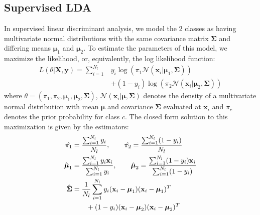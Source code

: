 \documentclass[10pt, a4paper, conference]{IEEEtran}
\begin{document}
\subsection{Supervised LDA}
In supervised linear discriminant analysis, we model the 2 classes as having multivariate normal distributions with the same covariance matrix $\boldsymbol{\Sigma}$ and differing means $\boldsymbol{\mu}_1$ and $\boldsymbol{\mu}_2$. To estimate the parameters of this model, we maximize the likelihood, or, equivalently, the log likelihood function:
\begin{align}
\label{eq:lda}
L(\theta|\mathbf{X},\mathbf{y})= \sum_{i=1}^{N_l} & y_i \log(\pi_1 \mathcal{N}(\mathbf{x}_i|\boldsymbol{\mu}_1,\mathbf{\Sigma})) \nonumber \\
& +(1-y_i) \log(\pi_2 \mathcal{N}(\mathbf{x}_i|\boldsymbol{\mu}_2,\mathbf{\Sigma}))
\end{align}
where $\theta=\left( \pi_1,\pi_2, \boldsymbol{\mu}_1,\boldsymbol{\mu}_2,\mathbf{\Sigma} \right)$, $\mathcal{N}(\mathbf{x}_i|\boldsymbol{\mu},\mathbf{\Sigma})$ denotes the density of a multivariate normal distribution with mean $\boldsymbol{\mu}$ and covariance $\mathbf{\Sigma}$ evaluated at $\mathbf{x}_i$ and $\pi_c$ denotes the prior probability for class $c$. The closed form solution to this maximization is given by the estimators:
\begin{align}
\label{eq:ldasolution}
\hat{\pi_1} &= \frac{\sum_{i=1}^{N_l} y_i}{N_l}, \hspace{20px} \hat{\pi_2} = \frac{\sum_{i=1}^{N_l} (1-y_i)}{N_l}  \nonumber \\
\hat{\boldsymbol{\mu}}_1 &= \frac{\sum_{i=1}^{N_l} y_i \mathbf{x}_i}{\sum_{i=1}^{N_l} y_i}, \hspace{20px} \hat{\boldsymbol{\mu}}_2 = \frac{\sum_{i=1}^{N_l} (1-y_i) \mathbf{x}_i}{\sum_{i=1}^{N_l} (1-y_i)}  \nonumber  \\
\hat{\mathbf{\Sigma}} &= \frac{1}{N_l} \sum_{i=1}^{N_l} y_i (\mathbf{x}_i-\boldsymbol{\mu}_1) (\mathbf{x}_i-\boldsymbol{\mu}_1)^T  \nonumber \\
& \hspace{20px} + (1-y_i) (\mathbf{x}_i-\boldsymbol{\mu}_2) (\mathbf{x}_i-\boldsymbol{\mu}_2)^T 
\end{align}
\end{document}

